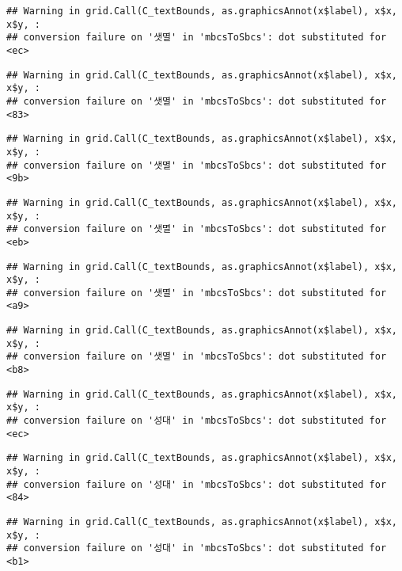 \documentclass[
]{article}
\begin{document}
\begin{verbatim}
## Warning in grid.Call(C_textBounds, as.graphicsAnnot(x$label), x$x, x$y, :
## conversion failure on '샛멸' in 'mbcsToSbcs': dot substituted for <ec>
\end{verbatim}

\begin{verbatim}
## Warning in grid.Call(C_textBounds, as.graphicsAnnot(x$label), x$x, x$y, :
## conversion failure on '샛멸' in 'mbcsToSbcs': dot substituted for <83>
\end{verbatim}

\begin{verbatim}
## Warning in grid.Call(C_textBounds, as.graphicsAnnot(x$label), x$x, x$y, :
## conversion failure on '샛멸' in 'mbcsToSbcs': dot substituted for <9b>
\end{verbatim}

\begin{verbatim}
## Warning in grid.Call(C_textBounds, as.graphicsAnnot(x$label), x$x, x$y, :
## conversion failure on '샛멸' in 'mbcsToSbcs': dot substituted for <eb>
\end{verbatim}

\begin{verbatim}
## Warning in grid.Call(C_textBounds, as.graphicsAnnot(x$label), x$x, x$y, :
## conversion failure on '샛멸' in 'mbcsToSbcs': dot substituted for <a9>
\end{verbatim}

\begin{verbatim}
## Warning in grid.Call(C_textBounds, as.graphicsAnnot(x$label), x$x, x$y, :
## conversion failure on '샛멸' in 'mbcsToSbcs': dot substituted for <b8>
\end{verbatim}

\begin{verbatim}
## Warning in grid.Call(C_textBounds, as.graphicsAnnot(x$label), x$x, x$y, :
## conversion failure on '성대' in 'mbcsToSbcs': dot substituted for <ec>
\end{verbatim}

\begin{verbatim}
## Warning in grid.Call(C_textBounds, as.graphicsAnnot(x$label), x$x, x$y, :
## conversion failure on '성대' in 'mbcsToSbcs': dot substituted for <84>
\end{verbatim}

\begin{verbatim}
## Warning in grid.Call(C_textBounds, as.graphicsAnnot(x$label), x$x, x$y, :
## conversion failure on '성대' in 'mbcsToSbcs': dot substituted for <b1>
\end{verbatim}
\end{document}
